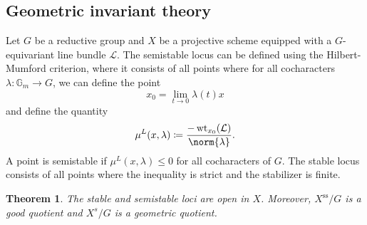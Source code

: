 \documentclass{amsart}
\newtheorem{thm}{Theorem}[section]
\theoremstyle{definition}
\theoremstyle{remark}
\theoremstyle{plain}
\theoremstyle{definition}
\theoremstyle{remark}
\newcommand{\G}{\mathbb{G}}
\newcommand{\mc}[1]{\mathcal{#1}}
\newcommand{\on}[1]{\operatorname{#1}}
\newcommand{\1}{\mathbf{1}}
\newcommand{\2}{\mathbf{2}}
\newcommand{\3}{\mathbf{3}}
\begin{document}
\subsection{Geometric invariant theory}%
\label{sub:Geometric invariant theory}

Let \(G\) be a reductive group and \(X\) be a projective scheme equipped with a \(G\)-equivariant line bundle \(\mc{L}\). The semistable locus can be defined using the Hilbert-Mumford criterion, where it consists of all points where for all cocharacters
\(\lambda \colon \G_m \to G\), we can define the point 
\[ x_0 = \lim_{t \to 0} \lambda(t) x \]
and define the quantity
\[ \mu^L(x, \lambda) \coloneqq \frac{-\on{wt}_{x_0}(\mc{L})}{\norm{\lambda}}. \]
A point is semistable if \(\mu^L(x, \lambda) \leq 0\) for all cocharacters of \(G\). The stable locus consists of all points where the inequality is strict and the stabilizer is finite.

\begin{thm}
    The stable and semistable loci are open in \(X\). Moreover, \(X^{\on{ss}}/G\) is a good quotient and \(X^s/G\) is a geometric quotient.  
\end{thm}
\end{document}
